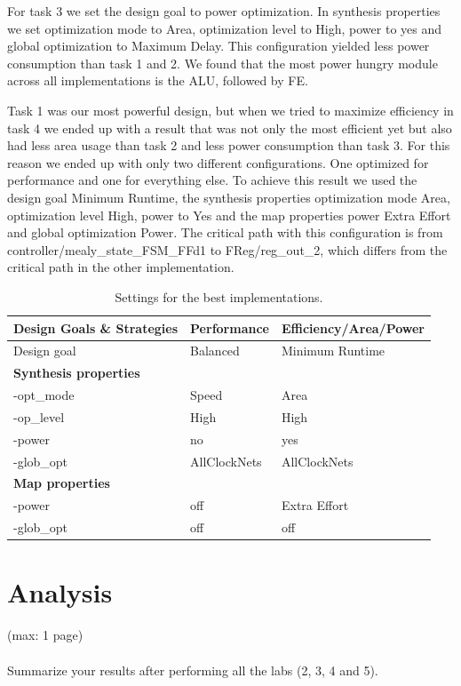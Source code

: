 \documentclass[a4,11pt]{article}
\begin{document}
For task 3 we set the design goal to power optimization. In synthesis properties we set optimization mode to Area, optimization level to High, power to yes and global optimization to Maximum Delay. This configuration yielded less power consumption than task 1 and 2.
We found that the most power hungry module across all implementations is the ALU, followed by FE.

Task 1 was our most powerful design, but when we tried to maximize efficiency in task 4 we ended up with a result that was not only the most efficient yet but also had less area usage than task 2 and less power consumption than task 3. For this reason we ended up with only two different configurations. One optimized for performance and one for everything else. To achieve this result we used the design goal Minimum Runtime, the synthesis properties optimization mode Area, optimization level High, power to Yes and the map properties power Extra Effort and global optimization Power. The critical path with this configuration is from controller/mealy\_state\_FSM\_FFd1 to FReg/reg\_out\_2, which differs from the critical path in the other implementation.


\begin{table}   
	\centering
	\small
	\def\arraystretch{1.1}              
	\begin{tabular}{|l|l|l|}
		\hline
		{\bf Design Goals \& Strategies} & \bf Performance  & \bf Efficiency/Area/Power \\ \hline
		Design goal       & Balanced   & Minimum Runtime     \\ \hline
		{\bf Synthesis properties} & & \\ \hline
		-opt\_mode         & Speed & Area    \\
		-op\_level         & High & High   \\ 
		-power            & no   & yes  \\ 
		-glob\_opt         & AllClockNets & AllClockNets  \\ \hline
		{\bf Map properties} & &   \\ \hline
		-power            & off  & Extra Effort   \\ 
		-glob\_opt         & off  & off \\ \hline
	\end{tabular}
	\caption{Settings for the best implementations.}
	\label{tab:set}
\end{table}

\section{Analysis}
(max: 1 page)
\\\\
Summarize your results after performing all the labs (2, 3, 4 and 5).
\end{document}

